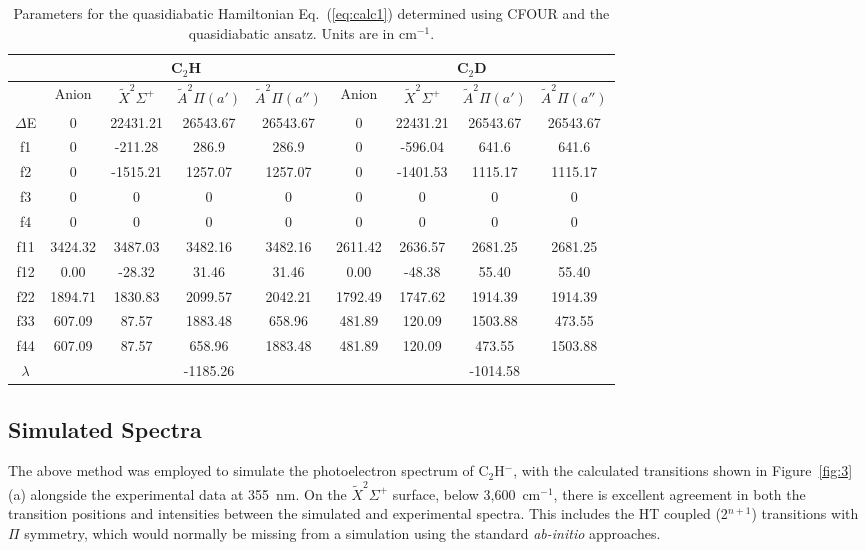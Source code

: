 \documentclass[journal=jpcafh,manuscript=article,layout=onecolumn, 12pt]{achemso}
\begin{document}
\begin{table}
	\caption{Parameters for the quasidiabatic Hamiltonian Eq.~(\ref{eq:calc1}) determined using CFOUR and the quasidiabatic ansatz. Units are in cm$^{-1}$.}
	\label{tab:1}
	\begin{tabular}{c |c c c c| c c c c }
		 & \multicolumn{4}{c}{C$_2$H}     & \multicolumn{4}{c}{C$_2$D}  \\ \hline
		  & Anion & $\tilde{X}^2\Sigma^+$ & $\tilde{A}^2\Pi (a')$ & $\tilde{A}^2\Pi (a'')$ & Anion & $\tilde{X}^2\Sigma^+$ & $\tilde{A}^2\Pi (a')$ & $\tilde{A}^2\Pi (a'')$ \\
		 \hline\hline
		 $\Delta$E & 0 & 22431.21 &  26543.67 & 26543.67 & 0&	22431.21 & 26543.67	& 26543.67\\
		 f1 & 0	& -211.28 & 286.9 &	286.9 & 0& -596.04& 641.6 & 641.6\\
		 f2 & 0 & -1515.21 & 1257.07 & 1257.07 & 0 & -1401.53 & 1115.17 & 1115.17\\
		 f3 & 0 & 0 & 0 & 0 & 0 & 0 & 0 & 0 \\
		 f4 & 0 & 0 & 0 & 0 & 0 & 0 & 0 & 0 \\
         f11 & 3424.32 & 3487.03 & 3482.16 & 3482.16 & 2611.42 & 2636.57 & 2681.25 & 2681.25\\
         f12 & 0.00 & -28.32 & 31.46 & 31.46 & 0.00 & -48.38 & 55.40 & 55.40\\
         f22 & 1894.71 & 1830.83 & 2099.57 & 2042.21 & 1792.49 & 1747.62 & 1914.39 & 1914.39\\
         f33 & 607.09 & 87.57 & 1883.48 & 658.96 & 481.89 & 120.09 & 1503.88 & 473.55\\
         f44 & 607.09 & 87.57 & 658.96 & 1883.48 & 481.89 & 120.09 & 473.55 & 1503.88\\
         $\lambda$ &  & & -1185.26 &  &  & & -1014.58 &  \\
         \end{tabular}
\end{table}

\subsection{Simulated Spectra}
The above method was employed to simulate the photoelectron spectrum of C$_2$H$^-$, with the calculated transitions shown in Figure~\ref{fig:3}(a) alongside the experimental data at 355~nm. %
On the $\tilde{X} ^2\Sigma^+$ surface, below 3,600~cm$^{-1}$, there is excellent agreement in both the transition positions and intensities between the simulated and experimental spectra. This includes the HT coupled (2$^{n+1}$) transitions with $\Pi$ symmetry, which would normally be missing from a simulation using the standard \emph{ab-initio} approaches. 
\end{document}
